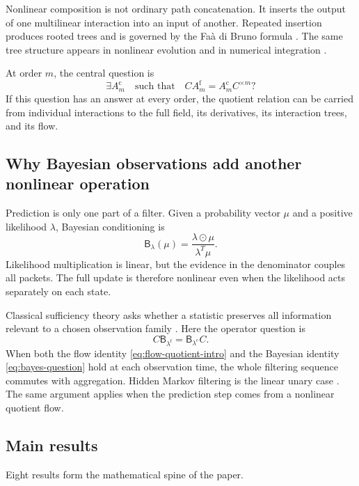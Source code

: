 \documentclass[11pt]{article}
\theoremstyle{definition}
\theoremstyle{remark}
\newcommand{\fine}{\mathrm f}
\newcommand{\coarse}{\mathrm c}
\newcommand{\Bup}{\mathsf B}
\begin{document}
Nonlinear composition is not ordinary path concatenation.  It inserts the output of one multilinear interaction into an input of another.  Repeated insertion produces rooted trees and is governed by the Fa\`a di Bruno formula \cite{ConstantineSavits1996}.  The same tree structure appears in nonlinear evolution and in numerical integration \cite{Butcher1972,HairerLubichWanner2006}.

At order $m$, the central question is
\begin{equation}\label{eq:arity-question}
  \exists A_m^{\coarse}
  \quad\text{such that}\quad
  C A_m^{\fine}=A_m^{\coarse}C^{\times m}?
\end{equation}
If this question has an answer at every order, the quotient relation can be carried from individual interactions to the full field, its derivatives, its interaction trees, and its flow.

\subsection{Why Bayesian observations add another nonlinear operation}
Prediction is only one part of a filter.  Given a probability vector $\mu$ and a positive likelihood $\lambda$, Bayesian conditioning is
\begin{equation}\label{eq:bayes-intro}
  \Bup_{\lambda}(\mu)
  =
  \frac{\lambda\odot\mu}{\lambda^T\mu}.
\end{equation}
Likelihood multiplication is linear, but the evidence in the denominator couples all packets.  The full update is therefore nonlinear even when the likelihood acts separately on each state.

Classical sufficiency theory asks whether a statistic preserves all information relevant to a chosen observation family \cite{HalmosSavage1949,Blackwell1953}.  Here the operator question is
\begin{equation}\label{eq:bayes-question}
  C\Bup_{\lambda^{\fine}}
  =
  \Bup_{\lambda^{\coarse}}C.
\end{equation}
When both the flow identity \eqref{eq:flow-quotient-intro} and the Bayesian identity \eqref{eq:bayes-question} hold at each observation time, the whole filtering sequence commutes with aggregation.  Hidden Markov filtering is the linear unary case \cite{BaumPetrie1966}.  The same argument applies when the prediction step comes from a nonlinear quotient flow.

\subsection{Main results}
Eight results form the mathematical spine of the paper.
\end{document}
